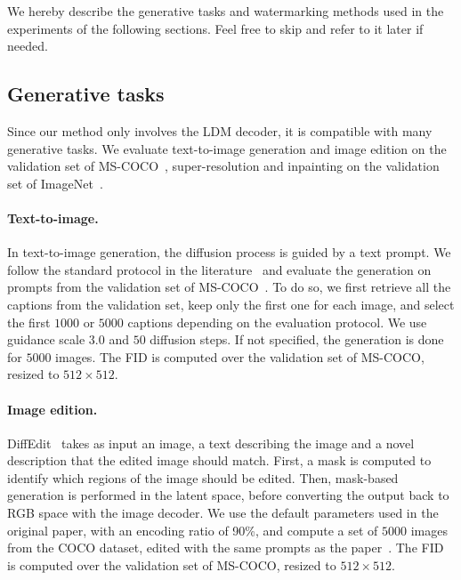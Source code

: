 We hereby describe the generative tasks and watermarking methods used in the experiments of the following sections.
Feel free to skip and refer to it later if needed.


\subsection{Generative tasks}\label{chap3/app:generative-tasks}

Since our method only involves the LDM decoder, it is compatible with many generative tasks. 
We evaluate text-to-image generation and image edition on the validation set of MS-COCO~\citep{lin2014microsoft}, super-resolution and inpainting on the validation set of ImageNet~\citep{deng2009imagenet}.


\paragraph*{Text-to-image.}
In text-to-image generation, the diffusion process is guided by a text prompt. 
We follow the standard protocol in the literature~\citep{ramesh2022hierarchical, ramesh2021zero, rombach2022high, saharia2022photorealistic} and evaluate the generation on prompts from the validation set of MS-COCO~\citep{lin2014microsoft}.
To do so, we first retrieve all the captions from the validation set, keep only the first one for each image, and select the first $1000$ or $5000$ captions depending on the evaluation protocol.
We use guidance scale $3.0$ and $50$ diffusion steps.
If not specified, the generation is done for $5000$ images.
The FID is computed over the validation set of MS-COCO, resized to $512\times 512$.

\paragraph*{Image edition.}
DiffEdit~\citep{couairon2022diffedit} takes as input an image, a text describing the image and a novel description that the edited image should match. 
First, a mask is computed to identify which regions of the image should be edited. 
Then, mask-based generation is performed in the latent space, before converting the output back to RGB space with the image decoder. 
We use the default parameters used in the original paper, with an encoding ratio of 90\%, and compute a set of $5000$ images from the COCO dataset, edited with the same prompts as the paper~\citep{couairon2022diffedit}.
The FID is computed over the validation set of MS-COCO, resized to $512\times 512$.

